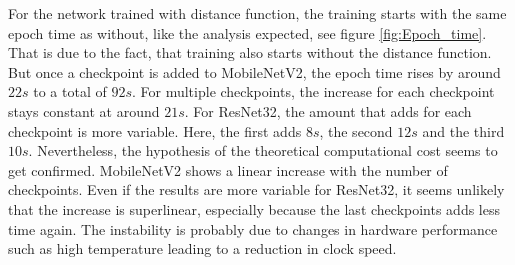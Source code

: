 For the network trained with distance function, the training starts with the same epoch
time as without, like the analysis expected, see figure \ref{fig:Epoch_time}. That is due to
the fact, that training also starts without the distance function. But once a
checkpoint is added to MobileNetV2, the epoch time rises by around $22s$ to a
total of $92s$. For multiple checkpoints, the increase for each checkpoint stays
constant at around $21s$. For ResNet32, the amount that adds for each checkpoint
is more variable. Here, the first adds $8s$, the second $12s$ and the third $10s$.
Nevertheless, the hypothesis of the theoretical computational cost seems to get
confirmed. MobileNetV2 shows a linear increase with the number of checkpoints. Even if the
results are more variable for ResNet32, it seems unlikely that the increase is
superlinear, especially because the last checkpoints adds less time again. The
instability is probably due to changes in hardware performance such as high
temperature leading to a reduction in clock speed.


